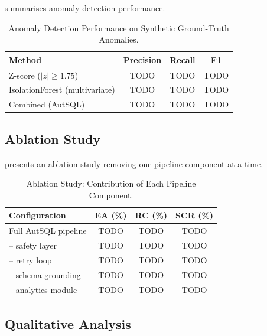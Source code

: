 \documentclass[conference]{IEEEtran}
\begin{document}
 summarises anomaly detection performance.

\begin{table}[t]
  \centering
  \caption{Anomaly Detection Performance on Synthetic Ground-Truth Anomalies.}
  \label{tab:anomaly-results}
  \begin{tabular}{@{}lccc@{}}
    \toprule
    \textbf{Method} & \textbf{Precision} & \textbf{Recall} & \textbf{F1} \\
    \midrule
    Z-score ($|z| \geq 1.75$)    & TODO & TODO & TODO \\
    IsolationForest (multivariate) & TODO & TODO & TODO \\
    Combined (AutSQL)              & TODO & TODO & TODO \\
    \bottomrule
  \end{tabular}
\end{table}

\subsection{Ablation Study}
\label{sec:eval:ablation}

 presents an ablation study removing one pipeline
component at a time.

\begin{table}[t]
  \centering
  \caption{Ablation Study: Contribution of Each Pipeline Component.}
  \label{tab:ablation}
  \begin{tabular}{@{}lccc@{}}
    \toprule
    \textbf{Configuration} & \textbf{EA (\%)} & \textbf{RC (\%)} & \textbf{SCR (\%)} \\
    \midrule
    Full AutSQL pipeline         & TODO & TODO & TODO \\
    \quad -- safety layer        & TODO & TODO & TODO \\
    \quad -- retry loop          & TODO & TODO & TODO \\
    \quad -- schema grounding    & TODO & TODO & TODO \\
    \quad -- analytics module    & TODO & TODO & TODO \\
    \bottomrule
  \end{tabular}
\end{table}

\subsection{Qualitative Analysis}
\label{sec:eval:qual}
\end{document}
